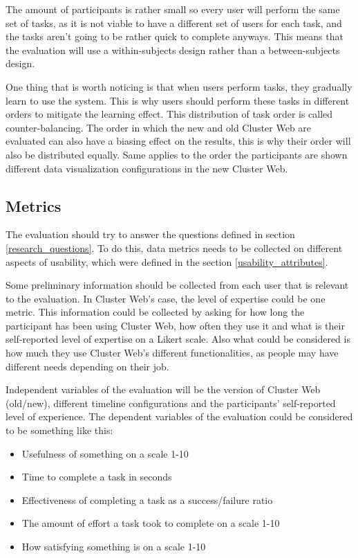 The amount of participants is rather small so every user will perform the same set of tasks, as it is not viable to have a different set of users for each task, and the tasks aren't going to be rather quick to complete anyways. This means that the evaluation will use a within-subjects design rather than a between-subjects design. 

One thing that is worth noticing is that when users perform tasks, they gradually learn to use the system. This is why users should perform these tasks in different orders to mitigate the learning effect. This distribution of task order is called counter-balancing. The order in which the new and old Cluster Web are evaluated can also have a biasing effect on the results, this is why their order will also be distributed equally. Same applies to the order the participants are shown different data visualization configurations in the new Cluster Web.
\cite{rubin2008handbook}

\subsection{Metrics}
The evaluation should try to answer the questions defined in section \ref{research_questions}. To do this, data metrics needs to be collected on different aspects of usability, which were defined in the section \ref{usability_attributes}.

Some preliminary information should be collected from each user that is relevant to the evaluation. In Cluster Web's case, the level of expertise could be one metric. This information could be collected by asking for how long the participant has been using Cluster Web, how often they use it and what is their self-reported level of expertise on a Likert scale. \cite{likert1932technique} Also what could be considered is how much they use Cluster Web's different functionalities, as people may have different needs depending on their job.

Independent variables of the evaluation will be the version of Cluster Web (old/new), different timeline configurations and the participants' self-reported level of experience. The dependent variables of the evaluation could be considered to be something like this:

\begin{itemize}
\item Usefulness of something on a scale 1-10
\item Time to complete a task in seconds
\item Effectiveness of completing a task as a success/failure ratio
\item The amount of effort a task took to complete on a scale 1-10
\item How satisfying something is on a scale 1-10
\end{itemize}

